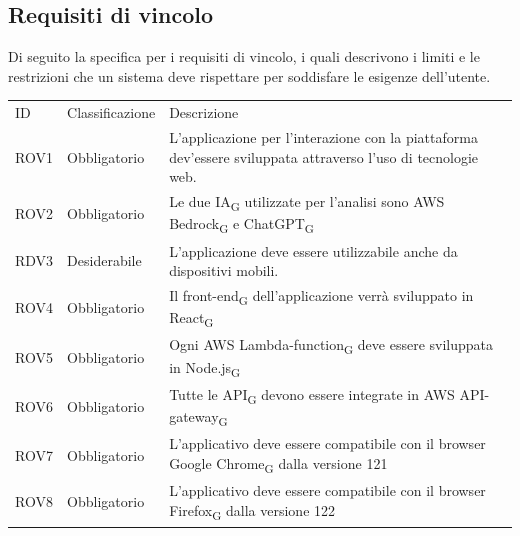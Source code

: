 \documentclass{article}
\begin{document}
\subsection{Requisiti di vincolo}
Di seguito la specifica per i requisiti di vincolo, i quali descrivono i limiti e le restrizioni che un sistema
deve rispettare per soddisfare le esigenze dell'utente.
\begin{center}

    \begin{tabular}{|p{3cm}|p{3cm}|p{6cm}|}
    \rowcolor{Blue} 
\hline
ID & Classificazione & Descrizione \\ 
\rowcolor{LightBlue}
\hline
ROV1& Obbligatorio & L'applicazione per l'interazione con la piattaforma dev'essere sviluppata attraverso l'uso di tecnologie web.\\ 
\hline
\rowcolor{LighterBlue}
ROV2& Obbligatorio & Le due IA\textsubscript{G} utilizzate per l'analisi sono AWS Bedrock\textsubscript{G} e ChatGPT\textsubscript{G} \\ 
\rowcolor{LightBlue}
\hline
RDV3& Desiderabile & L'applicazione deve essere utilizzabile anche da dispositivi mobili.\\
\hline
\rowcolor{LighterBlue}

ROV4& Obbligatorio & Il front-end\textsubscript{G} dell'applicazione verrà sviluppato in React\textsubscript{G}\\
\rowcolor{LightBlue}
\hline
ROV5& Obbligatorio & Ogni AWS Lambda-function\textsubscript{G} deve essere sviluppata in Node.js\textsubscript{G}\\
\hline
\rowcolor{LighterBlue}

ROV6& Obbligatorio & Tutte le API\textsubscript{G} devono essere integrate in AWS API-gateway\textsubscript{G}\\
\hline
\rowcolor{LightBlue}
ROV7& Obbligatorio & L'applicativo deve essere compatibile con il browser Google Chrome\textsubscript{G} dalla versione 121\\
\hline
\rowcolor{LighterBlue}
ROV8& Obbligatorio & L'applicativo deve essere compatibile con il browser Firefox\textsubscript{G} dalla versione 122\\
\hline
\end{tabular}
\end{center}
\end{document}
